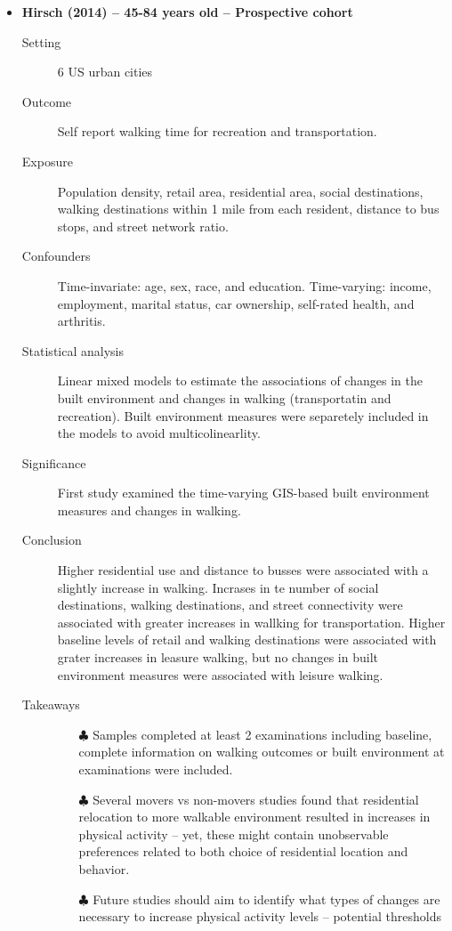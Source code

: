\documentclass{article}
\begin{document}
\begin{itemize}
	\item{\bf Hirsch (2014) -- 45-84 years old -- Prospective cohort} 
		\begin{description}
			\item[Setting] 6 US urban cities
			\item[Outcome] Self report walking time for recreation and transportation.
			\item[Exposure] Population density, retail area, residential area, social destinations, walking destinations within 1 mile from each resident, distance to bus stops, and street network ratio.
			\item[Confounders] Time-invariate: age, sex, race, and education. Time-varying: income, employment, marital status, car ownership, self-rated health, and arthritis. 
			\item[Statistical analysis] Linear mixed models to estimate the associations of changes in the built environment and changes in walking (transportatin and recreation). Built environment measures were separetely included in the models to avoid multicolinearlity.
			\item[Significance] First study examined the time-varying GIS-based built environment measures and changes in walking.
			\item[Conclusion] Higher residential use and distance to busses were associated with a slightly increase in walking. Incrases in te number of social destinations, walking destinations, and street connectivity were associated with greater increases in wallking for transportation. Higher baseline levels of retail and walking destinations were associated with grater increases in leasure walking, but no changes in built environment measures were associated with leisure walking.
			\item[Takeaways] \mbox{}\par
				\begin{itemize}
					\item[$\clubsuit$] Samples completed at least 2 examinations including baseline, complete information on walking outcomes or built environment at examinations were included.
					\item[$\clubsuit$] Several movers vs non-movers studies found that residential relocation to more walkable environment resulted in increases in physical activity -- yet, these might contain unobservable preferences related to both choice of residential location and behavior.
					\item[$\clubsuit$] Future studies should aim to identify what types of changes are necessary to increase physical activity levels -- potential thresholds
				\end{itemize}
		\end{description}


\end{itemize}
\end{document}

